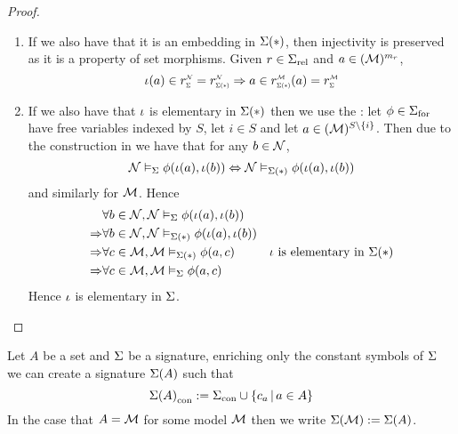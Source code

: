 \begin{proof}
\begin{enumerate}
        \item If we also have that it is an embedding in $\Sigma(*)$, 
            then injectivity is preserved as it is a property of set morphisms. 
            Given $r \in {\Sigma}_\mathrm{rel}$ and $a \in ({\mathcal{M}})^{m_r}$,
            \[
                \io(a)  \in \subintp{\Si}{\NN}{r}
                = \subintp{\Si(*)}{\NN}{r}
                \implies 
                a \in \subintp{\Si(*)}{\MM}{r}(a)
                = \subintp{\Si}{\MM}{r}
            \]
        \item If we also have that $\iota$ is elementary in $\Sigma(*)$ 
            then we use the :
            let $\phi \in {\Sigma}_\mathrm{for}$ have free variables indexed by $S$,
            let $i \in S$ 
            and let $a \in ({\mathcal{M}})^{S \setminus \left\{i\right\}}$.
            Then due to the construction in
            we have that for any $b \in {\mathcal{N}}$, 
            \[\mathcal{N} \vDash_{\Sigma} \phi (\iota(a),\iota(b)) 
            \Leftrightarrow \mathcal{N} \vDash_{\Sigma(*)} \phi (\iota(a),\iota(b))\]
            and similarly for $\mathcal{M}$.
            Hence 
            \begin{align*}
                &\forall b \in {\mathcal{N}}, 
                \mathcal{N} \vDash_{\Sigma} \phi(\iota(a),\iota(b)) \\
                \Rightarrow &\forall b \in {\mathcal{N}}, 
                \mathcal{N} \vDash_{\Sigma(*)} \phi(\iota(a),\iota(b)) \\
                \Rightarrow &\forall c \in {\mathcal{M}}, 
                \mathcal{M} \vDash_{\Sigma(*)} \phi(a,c) 
                & \text{$\iota$ is elementary in $\Sigma(*)$}\\
                \Rightarrow &\forall c \in {\mathcal{M}}, \mathcal{M} \vDash_{\Sigma} \phi(a,c)
            \end{align*}
            Hence $\iota$ is elementary in $\Sigma$.
    \end{enumerate}
\end{proof}

\begin{nttn}
    Let $A$ be a set and $\Sigma$ be a signature,
    enriching only the constant symbols of $\Sigma$ we can create a signature 
    $\Sigma(A)$ such that 
    \[{\Sigma(A)}_\mathrm{con} := 
        {\Sigma}_\mathrm{con} \cup \left\{c_a \,|\, a \in A\right\}\]
    In the case that $A = {\mathcal{M}}$ for some model $\mathcal{M}$ then we write
    $\Sigma(\mathcal{M}) := \Sigma(A)$.
\end{nttn}

